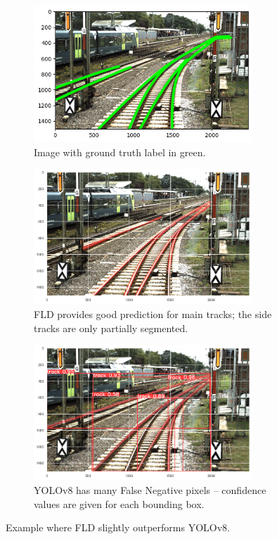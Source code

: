 \documentclass[Master,MDS,english]{BASE/twbook} %
\begin{document}
\begin{figure}
\centering
\begin{subfigure}[t]{.33\textwidth}
  \centering
  \includegraphics[width=0.9\textwidth]{images/results/example2_gt}
  \caption{Image with ground truth label in green.}
\end{subfigure}
\begin{subfigure}[t]{.33\textwidth}
  \centering
  \includegraphics[width=0.9\textwidth]{images/results/example2}
  \caption{FLD provides good prediction for main tracks; the side tracks are only partially segmented.}
\end{subfigure}%
\begin{subfigure}[t]{.33\textwidth}
  \centering
  \includegraphics[width=0.9\textwidth]{images/results/example3}
  \caption{YOLOv8 has many False Negative pixels -- confidence values are given for each bounding box. }
\end{subfigure}
\caption{Example where FLD slightly outperforms YOLOv8.}
\label{fig:res_example2}
\end{figure}
\end{document}
